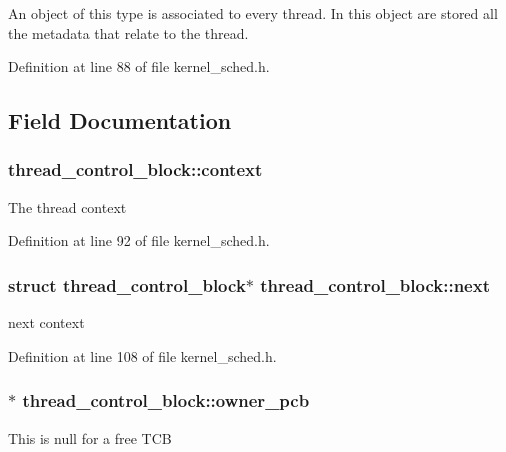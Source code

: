 An object of this type is associated to every thread. In this object are stored all the metadata that relate to the thread. 

Definition at line 88 of file kernel\+\_\+sched.\+h.



\subsection{Field Documentation}
\subsubsection[{\texorpdfstring{context}{context}}]{ thread\+\_\+control\+\_\+block\+::context}\hypertarget{structthread__control__block_a9c107039dffa851dde6edabd6cd3f89c}{}\label{structthread__control__block_a9c107039dffa851dde6edabd6cd3f89c}
The thread context 

Definition at line 92 of file kernel\+\_\+sched.\+h.

\subsubsection[{\texorpdfstring{next}{next}}]{\setlength{\rightskip}{0pt plus 5cm}struct {\bf thread\+\_\+control\+\_\+block}$\ast$ thread\+\_\+control\+\_\+block\+::next}\hypertarget{structthread__control__block_ac6b51ca735291f730ca1d4c335fb9359}{}\label{structthread__control__block_ac6b51ca735291f730ca1d4c335fb9359}
next context 

Definition at line 108 of file kernel\+\_\+sched.\+h.

\subsubsection[{\texorpdfstring{owner\+\_\+pcb}{owner_pcb}}]{$\ast$ thread\+\_\+control\+\_\+block\+::owner\+\_\+pcb}\hypertarget{structthread__control__block_a74aa312623cb8be2bc719d5210b58c04}{}\label{structthread__control__block_a74aa312623cb8be2bc719d5210b58c04}
This is null for a free T\+CB 

